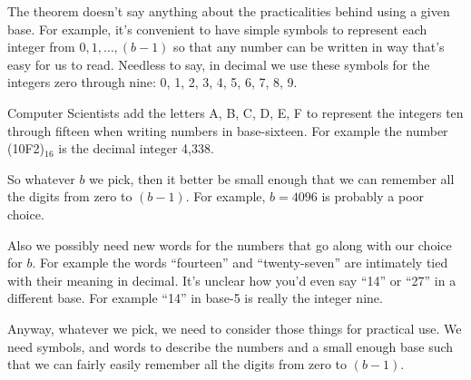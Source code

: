\documentclass{article}
\begin{document}
The theorem doesn't say anything about the practicalities behind
using a given base. For example, it's convenient to have 
simple symbols to represent each integer from \(0, 1, \dots{}, (b-1)\) so
that any number can be written in way that's easy for us to read. Needless to say,
in decimal we use these symbols for the integers zero through nine: 0, 1, 2, 3, 4, 5, 6, 7, 8, 9.

Computer Scientists add the letters A, B, C, D, E, F to represent the integers ten through fifteen
when writing numbers in base-sixteen. For example the number (10F2)\(_{16}\) is the decimal integer
4,338.

So whatever \(b\) we pick, then it better be small enough that we can remember all the digits
from zero to \((b-1)\). For example, \(b = 4096\) is probably a poor choice.

Also we possibly need new words for the numbers that go along with our choice for \(b\).
For example the words ``fourteen'' and ``twenty-seven'' are intimately tied with their meaning in decimal.
It's unclear how you'd even say ``14'' or ``27'' in a different base. For example ``14'' in base-5 is really the
integer nine.

Anyway, whatever we pick, we need to consider those things for practical use. We need symbols, and words to
describe the numbers and a small enough base such that we can fairly easily remember all the digits 
from zero to \((b-1)\).
\end{document}
